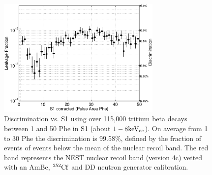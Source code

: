 \begin{figure}[h!]\centering
\includegraphics[width=80mm]{CH3T_Leakage_fid_50_Dec_Tritium_Approval_Plots.eps}
\caption{Discrimination vs. S1 using over 115,000 tritium beta decays between 1 and 50 Phe in S1 (about $\rm1-8 keV_{ee}$). On average from 1 to 30 Phe the discrimination is 99.58\%, defined by the fraction of events of events below the mean of the nuclear recoil band. The red band represents the NEST nuclear recoil band (version 4c) vetted with an AmBe, $\rm^{252}Cf$ and DD neutron generator calibration.}
\label{fig:Leak}
\end{figure}

